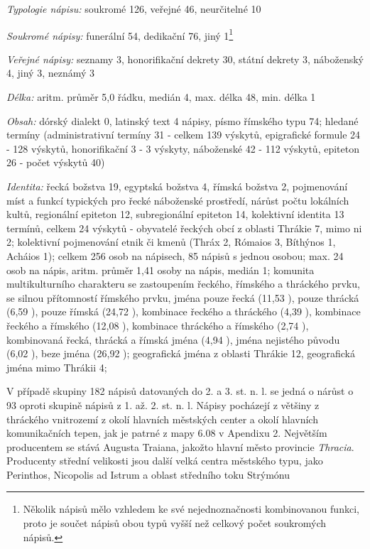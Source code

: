 {\em Typologie nápisu:} soukromé 126, veřejné 46, neurčitelné 10

{\em Soukromé nápisy:} funerální 54, dedikační 76, jiný 1\footnote{Několik nápisů mělo vzhledem ke své nejednoznačnosti kombinovanou funkci, proto je součet nápisů obou typů vyšší než celkový počet soukromých nápisů.}

{\em Veřejné nápisy:} seznamy 3, honorifikační dekrety 30, státní dekrety 3, náboženský 4, jiný 3, neznámý 3

{\em Délka:} aritm. průměr 5,0 řádku, medián 4, max. délka 48, min. délka 1

{\em Obsah:} dórský dialekt 0, latinský text 4 nápisy, písmo římského typu 74; hledané termíny (administrativní termíny 31 - celkem 139 výskytů, epigrafické formule 24 - 128 výskytů, honorifikační 3 - 3 výskyty, náboženské 42 - 112 výskytů, epiteton 26 - počet výskytů 40)

{\em Identita:} řecká božstva 19, egyptská božstva 4, římská božstva 2, pojmenování míst a funkcí typických pro řecké náboženské prostředí, nárůst počtu lokálních kultů, regionální epiteton 12, subregionální epiteton 14, kolektivní identita 13 termínů, celkem 24 výskytů - obyvatelé řeckých obcí z oblasti Thrákie 7, mimo ni 2; kolektivní pojmenování etnik či kmenů (Thráx 2, Rómaios 3, Bíthýnos 1, Acháios 1); celkem 256 osob na nápisech, 85 nápisů s jednou osobou; max. 24 osob na nápis, aritm. průměr 1,41 osoby na nápis, medián 1; komunita multikulturního charakteru se zastoupením řeckého, římského a thráckého prvku, se silnou přítomností římského prvku, jména pouze řecká (11,53 ), pouze thrácká (6,59 ), pouze římská (24,72 ), kombinace řeckého a thráckého (4,39 ), kombinace řeckého a římského (12,08 ), kombinace thráckého a římského (2,74 ), kombinovaná řecká, thrácká a římská jména (4,94 ), jména nejistého původu (6,02 ), beze jména (26,92 ); geografická jména z oblasti Thrákie 12, geografická jména mimo Thrákii 4;

\NC\AR
\HL
\HL
\stoptable

V případě skupiny 182 nápisů datovaných do 2. a 3. st. n. l. se jedná o nárůst o 93  oproti skupině nápisů z 1. až. 2. st. n. l. Nápisy pocházejí z většiny z thráckého vnitrozemí z okolí hlavních městských center a okolí hlavních komunikačních tepen, jak je patrné z mapy 6.08 v Apendixu 2. Největším producentem se stává Augusta Traiana, jakožto hlavní město provincie {\em Thracia}. Producenty střední velikosti jsou další velká centra městského typu, jako Perinthos, Nicopolis ad Istrum a oblast středního toku Strýmónu

